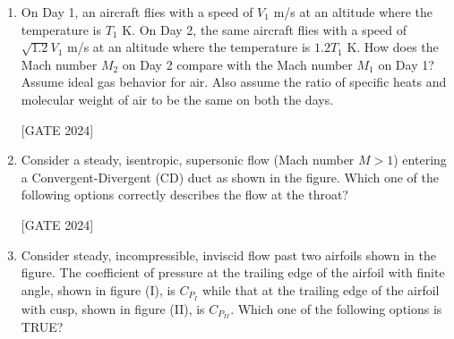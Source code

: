 \documentclass[journal,12pt,onecolumn]{IEEEtran}
\theoremstyle{remark}
\begin{document}
\begin{enumerate}
    \item On Day 1, an aircraft flies with a speed of $ V_1 $ m/s at an altitude where the temperature is $ T_1 $ K. On Day 2, the same aircraft flies with a speed of $ \sqrt{1.2} V_1 $ m/s at an altitude where the temperature is $ 1.2 T_1 $ K. How does the Mach number $ M_2 $ on Day 2 compare with the Mach number $ M_1 $ on Day 1?
    Assume ideal gas behavior for air. Also assume the ratio of specific heats and molecular weight of air to be the same on both the days.
   
        \hfill{[GATE 2024]}\begin{enumerate}   \end{enumerate}
   

    \item Consider a steady, isentropic, supersonic flow (Mach number $ M > 1 $) entering a Convergent-Divergent (CD) duct as shown in the figure. Which one of the following options correctly describes the flow at the throat?
    
   
        \hfill{[GATE 2024]}\begin{enumerate}  \end{enumerate}
    

    \item Consider steady, incompressible, inviscid flow past two airfoils shown in the figure. The coefficient of pressure at the trailing edge of the airfoil with finite angle, shown in figure (I), is $ C_{P_I} $ while that at the trailing edge of the airfoil with cusp, shown in figure (II), is $ C_{P_{II}} $. Which one of the following options is TRUE? 
    

\end{enumerate}
\end{document}
